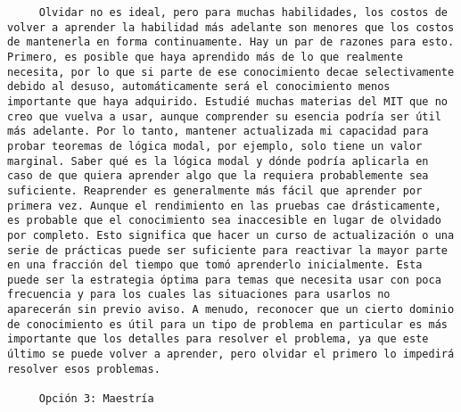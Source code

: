\begin{verbatim}
	 Olvidar no es ideal, pero para muchas habilidades, los costos de volver a aprender la habilidad más adelante son menores que los costos de mantenerla en forma continuamente. Hay un par de razones para esto. Primero, es posible que haya aprendido más de lo que realmente necesita, por lo que si parte de ese conocimiento decae selectivamente debido al desuso, automáticamente será el conocimiento menos importante que haya adquirido. Estudié muchas materias del MIT que no creo que vuelva a usar, aunque comprender su esencia podría ser útil más adelante. Por lo tanto, mantener actualizada mi capacidad para probar teoremas de lógica modal, por ejemplo, solo tiene un valor marginal. Saber qué es la lógica modal y dónde podría aplicarla en caso de que quiera aprender algo que la requiera probablemente sea suficiente. Reaprender es generalmente más fácil que aprender por primera vez. Aunque el rendimiento en las pruebas cae drásticamente, es probable que el conocimiento sea inaccesible en lugar de olvidado por completo. Esto significa que hacer un curso de actualización o una serie de prácticas puede ser suficiente para reactivar la mayor parte en una fracción del tiempo que tomó aprenderlo inicialmente. Esta puede ser la estrategia óptima para temas que necesita usar con poca frecuencia y para los cuales las situaciones para usarlos no aparecerán sin previo aviso. A menudo, reconocer que un cierto dominio de conocimiento es útil para un tipo de problema en particular es más importante que los detalles para resolver el problema, ya que este último se puede volver a aprender, pero olvidar el primero lo impedirá resolver esos problemas.
	 
	 Opción 3: Maestría
	 

\end{verbatim}
